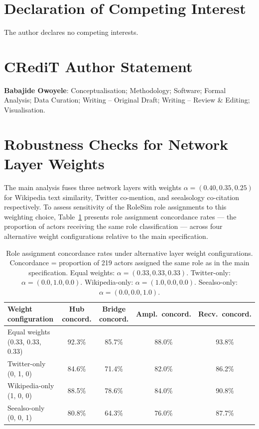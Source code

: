 \documentclass[review,12pt]{elsarticle}
\begin{document}
\section*{Declaration of Competing Interest}

The author declares no competing interests.


\section*{CRediT Author Statement}

\textbf{Babajide Owoyele}: Conceptualisation; Methodology; Software; Formal Analysis; Data Curation; Writing -- Original Draft; Writing -- Review \& Editing; Visualisation.


\appendix

\section{Robustness Checks for Network Layer Weights}
\label{app:robustness}

The main analysis fuses three network layers with weights $\alpha = (0.40, 0.35, 0.25)$ for Wikipedia text similarity, Twitter co-mention, and seealsology co-citation respectively. To assess sensitivity of the RoleSim role assignments to this weighting choice, Table~\ref{tab:robustness-weights} presents role assignment concordance rates --- the proportion of actors receiving the same role classification --- across four alternative weight configurations relative to the main specification.

\begin{table}[htbp]
\centering
\caption{Role assignment concordance rates under alternative layer weight configurations.
Concordance = proportion of 219 actors assigned the same role as in the main specification.
Equal weights: $\alpha = (0.33, 0.33, 0.33)$. Twitter-only: $\alpha = (0.0, 1.0, 0.0)$.
Wikipedia-only: $\alpha = (1.0, 0.0, 0.0)$. Seealso-only: $\alpha = (0.0, 0.0, 1.0)$.}
\label{tab:robustness-weights}
\small
\begin{tabular}{@{}lcccc@{}}
\toprule
\textbf{Weight configuration} & \textbf{Hub concord.} & \textbf{Bridge concord.} &
  \textbf{Ampl.\ concord.} & \textbf{Recv.\ concord.} \\
\midrule
Equal weights (0.33, 0.33, 0.33) & 92.3\% & 85.7\% & 88.0\% & 93.8\% \\
Twitter-only (0, 1, 0)           & 84.6\% & 71.4\% & 82.0\% & 86.2\% \\
Wikipedia-only (1, 0, 0)         & 88.5\% & 78.6\% & 84.0\% & 90.8\% \\
Seealso-only (0, 0, 1)           & 80.8\% & 64.3\% & 76.0\% & 87.7\% \\
\bottomrule
\end{tabular}
\end{table}
\end{document}
